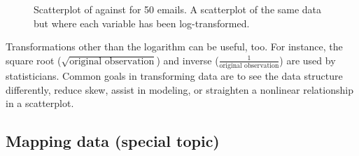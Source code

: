 \begin{figure}
\centering
{}
\caption{ Scatterplot of  against  for 50 emails.  A scatterplot of the same data but where each variable has been log-transformed.}
\label{email50LinesCharactersModMain}
\end{figure}

Transformations other than the logarithm can be useful, too. For instance, the square root ($\sqrt{\text{original observation}}$) and inverse ($\frac{1}{\text{original observation}}$) are used by statisticians. Common goals in transforming data are to see the data structure differently, reduce skew, assist in modeling, or straighten a nonlinear relationship in a scatterplot.


\subsection{Mapping data (special topic)}


